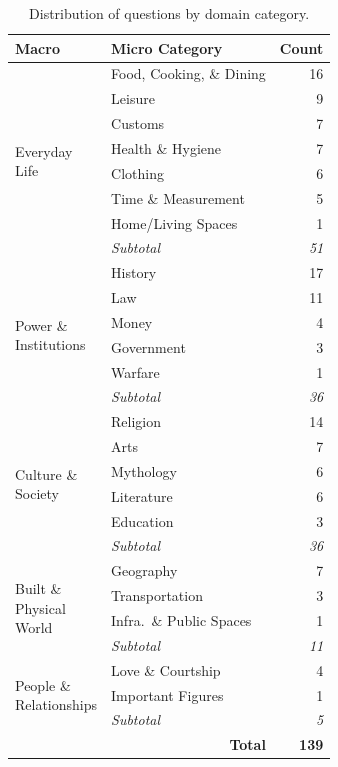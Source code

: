 \begin{table}[t!]
\setlength{\tabcolsep}{4pt}
\begin{tabular}{@{}p{2cm}lr@{}}
\toprule
\textbf{Macro} & \textbf{Micro Category} & \textbf{Count} \\
\midrule
\multirow{8}{*}{\parbox{2cm}{Everyday\\Life}}
  & Food, Cooking, \& Dining & 16 \\
  & Leisure & 9 \\
  & Customs & 7 \\
  & Health \& Hygiene & 7 \\
  & Clothing & 6 \\
  & Time \& Measurement & 5 \\
  & Home/Living Spaces & 1 \\
\cmidrule(l){2-3}
  & \hfill\textit{Subtotal} & \textit{51} \\
\midrule
\multirow{6}{*}{\parbox{2cm}{Power \&\\Institutions}}
  & History & 17 \\
  & Law & 11 \\
  & Money & 4 \\
  & Government & 3 \\
  & Warfare & 1 \\
\cmidrule(l){2-3}
  & \hfill\textit{Subtotal} & \textit{36} \\
\midrule
\multirow{6}{*}{\parbox{2cm}{Culture \&\\Society}}
  & Religion & 14 \\
  & Arts & 7 \\
  & Mythology & 6 \\
  & Literature & 6 \\
  & Education & 3 \\
\cmidrule(l){2-3}
  & \hfill\textit{Subtotal} & \textit{36} \\
\midrule
\multirow{4}{*}{\parbox{2cm}{Built \&\\Physical\\World}}
  & Geography & 7 \\
  & Transportation & 3 \\
  & Infra.\ \& Public Spaces & 1 \\
\cmidrule(l){2-3}
  & \hfill\textit{Subtotal} & \textit{11} \\
\midrule
\multirow{3}{*}{\parbox{2cm}{People \&\\Relationships}}
  & Love \& Courtship & 4 \\
  & Important Figures & 1 \\
\cmidrule(l){2-3}
  & \hfill\textit{Subtotal} & \textit{5} \\
\midrule
\multicolumn{2}{r}{\textbf{Total}} & \textbf{139} \\
\bottomrule
\end{tabular}
\centering
\caption{Distribution of questions by domain category.}
\label{tab:question-domains}
\end{table}